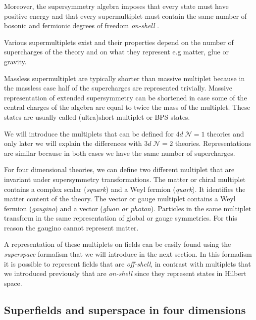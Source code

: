 \begin{appendices}
Moreover, the supersymmetry algebra imposes that every state must have positive energy and that every supermultiplet must contain the same number of bosonic and fermionic degrees of freedom \emph{on-shell} .

Various supermultiplets exist and their properties depend on the number of supercharges of the theory and on what they represent e.g matter, glue or gravity. 

Massless supermultiplet are typically shorter than massive multiplet because in the massless case half of the supercharges are represented trivially.
Massive representation of extended supersymmetry can be shortened in case some of the central charges of the algebra are equal to twice the mass of the multiplet. These states are usually called (ultra)short multiplet or BPS states.


We will introduce the multiplets that can be defined for $4d \; \mathcal{N} = 1$ theories and only later we will explain the differences with $3d \; \mathcal{N} = 2$ theories.
Representations are similar because in both cases we have the same number of supercharges.

For four dimensional theories, we can define two different multiplet that are invariant under supersymmetry transformations.
The matter or chiral multiplet contains a complex scalar (\emph{squark}) and a Weyl fermion (\emph{quark}). It identifies the matter content of the theory.
The vector or gauge multiplet contains a Weyl fermion (\emph{gaugino}) and a vector (\emph{gluon or photon}).
Particles in the same multiplet transform in the same representation of global or gauge symmetries. For this reason the gaugino cannot represent matter.


A representation of these multiplets on fields can be easily found using the \emph{superspace} formalism that we will introduce in the next section.
In this formalism it is possible to represent fields  that are \emph{off-shell}, in contrast with multiplets that we introduced previously that are \emph{on-shell} since they represent states in Hilbert space.\\











\subsection{Superfields and superspace in four dimensions}


\end{appendices}

